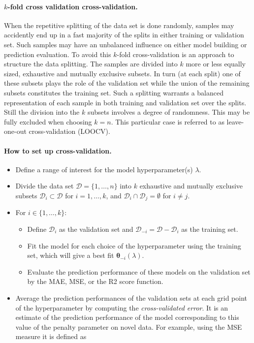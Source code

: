 \documentclass[%
oneside,                 %
final,                   %
10pt]{article}
\begin{document}
\paragraph{$k$-fold cross validation cross-validation.}
When the repetitive splitting of the data set is done randomly,
samples may accidently end up in a fast majority of the splits in
either training or validation set. Such samples may have an unbalanced
influence on either model building or prediction evaluation. To avoid
this $k$-fold cross-validation is an approach to structure the data splitting. The
samples are divided into $k$ more or less equally sized, exhaustive and
mutually exclusive subsets. In turn (at each split) one of these
subsets plays the role of the validation set while the union of the
remaining subsets constitutes the training set. Such a splitting
warrants a balanced representation of each sample in both training and
validation set over the splits. Still the division into the $k$ subsets
involves a degree of randomness. This may be fully excluded when
choosing $k=n$. This particular case is referred to as leave-one-out
cross-validation (LOOCV). 

\paragraph{How to set up cross-validation.}
\begin{itemize}
\item Define a range of interest for the  model hyperparameter(s) $\lambda$.

\item Divide the data set $\mathcal{D} = \{1, \ldots, n\}$ into $k$ exhaustive and mutually exclusive subsets $\mathcal{D}_{i} \subset \mathcal{D}$ for $i=1,\ldots,k$, and $\mathcal{D}_{i} \cap \mathcal{D}_{j} = \emptyset$ for $i \neq j$.

\item For $i \in \{1, \ldots, k\}$:
\begin{itemize}

  \item Define $\mathcal{D}_{i}$ as the validation set and $\mathcal{D}_{-i} = \mathcal{D} - \mathcal{D}_i$ as the training set.

  \item Fit the model for each choice of the hyperparameter using the training set, which will give a best fit $\bm{\theta}_{-i}(\lambda)$.

  \item Evaluate the prediction performance of these models on the validation set by the MAE, MSE, or the R2 score function. 

\end{itemize}

\noindent
\item Average the prediction performances of the validation sets at each grid point of the hyperparameter by computing the \emph{cross-validated error}. It is an estimate of the prediction performance of the model corresponding to this value of the penalty parameter on novel data. For example, using the MSE measure it is defined as
\end{itemize}
\end{document}
